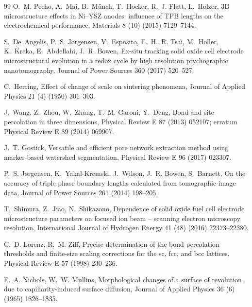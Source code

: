 \documentclass[5p,times,twocolumn]{elsarticle}
\begin{document}
\begin{thebibliography}{99}
O.~M. Pecho, A.~Mai, B.~M\"unch, T.~Hocker, R.~J. Flatt, L.~Holzer,
3D microstructure effects in Ni--YSZ anodes: influence of TPB lengths on the
electrochemical performance,
Materials 8 (10) (2015) 7129--7144.

S.~De~Angelis, P.~S. J{\o}rgensen, V.~Esposito, E.~H.~R. Tsai, M.~Holler,
K.~Kreka, E.~Abdellahi, J.~R. Bowen,
Ex-situ tracking solid oxide cell electrode microstructural evolution in a
redox cycle by high resolution ptychographic nanotomography,
Journal of Power Sources 360 (2017) 520--527.

C.~Herring,
Effect of change of scale on sintering phenomena,
Journal of Applied Physics 21 (4) (1950) 301--303.

J.~Wang, Z.~Zhou, W.~Zhang, T.~M. Garoni, Y.~Deng,
Bond and site percolation in three dimensions,
Physical Review E 87 (2013) 052107; erratum Physical Review E 89 (2014)
069907.

J.~T. Gostick,
Versatile and efficient pore network extraction method using marker-based
watershed segmentation,
Physical Review E 96 (2017) 023307.

P.~S. J{\o}rgensen, K.~Yakal-Kremski, J.~Wilson, J.~R. Bowen, S.~Barnett,
On the accuracy of triple phase boundary lengths calculated from tomographic
image data,
Journal of Power Sources 261 (2014) 198--205.

T.~Shimura, Z.~Jiao, N.~Shikazono,
Dependence of solid oxide fuel cell electrode microstructure parameters on
focused ion beam -- scanning electron microscopy resolution,
International Journal of Hydrogen Energy 41 (48) (2016) 22373--22380.

C.~D. Lorenz, R.~M. Ziff,
Precise determination of the bond percolation thresholds and finite-size
scaling corrections for the sc, fcc, and bcc lattices,
Physical Review E 57 (1998) 230--236.

F.~A. Nichols, W.~W. Mullins,
Morphological changes of a surface of revolution due to capillarity-induced
surface diffusion,
Journal of Applied Physics 36 (6) (1965) 1826--1835.

\end{thebibliography}
\end{document}
